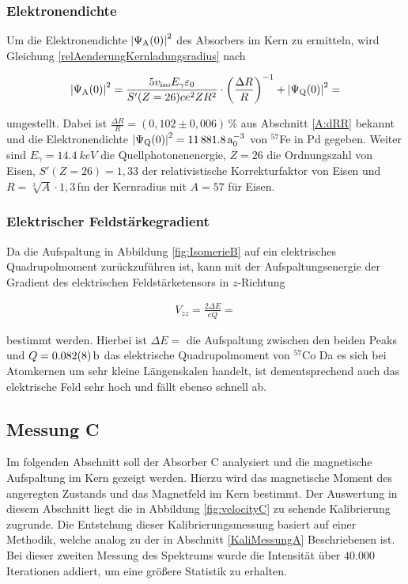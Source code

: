 \documentclass[
a4paper,                %
titlepage=firstiscover, %
captions=tableheading,  %
toc=bibliography,       %
toc=listof,             %
oneside,                %
automark,               %
12pt,                   %
english, ngerman,       %
parskip = half,         %
]{scrartcl}
\begin{document}
\subsubsection{Elektronendichte}

Um die Elektronendichte $\abs{\Psi_\text{A}(0)}^2$ des Absorbers im Kern zu ermitteln, wird Gleichung \ref{relAenderungKernladungsradius} nach

\begin{align}
\abs{\Psi_\text{A}(0)}^2 = \frac{5 v_\text{iso} E_\gamma \varepsilon_0}{S'(Z = 26) c e^2 Z R^2}\cdot\left( \frac{\Delta R}{R}\right) ^{-1} + \abs{\Psi_\text{Q}(0)}^2 = 
\end{align}

\noindent umgestellt.
Dabei ist $\frac{\Delta R}{R}=(0,102\pm 0,006)\,$\% aus Abschnitt \ref{A:dRR} bekannt und die Elektronendichte $\abs{\Psi_\text{Q}(0)}^2 = \SI{11881,8}{a_0^{-3}}$ von $^57$Fe in Pd gegeben.
Weiter sind $E_\gamma = \SI{14,4}{keV}$ die Quellphotonenenergie, $Z=26$ die Ordnungszahl von Eisen, $S'(Z = 26) = 1,33$ der relativistische Korrekturfaktor von Eisen und $R=\sqrt[3]{A}\cdot 1,3\,$fm der Kernradius mit $A=57$ für Eisen.


\subsubsection{Elektrischer Feldstärkegradient}

Da die Aufspaltung in Abbildung \ref{fig:IsomerieB} auf ein elektrisches Quadrupolmoment zurückzuführen ist, kann mit der Aufspaltungsenergie der Gradient des elektrischen Feldstärketensors in $z$-Richtung

\begin{align}
V_{zz} = \frac{2 \Delta E}{e Q} = 
\end{align}

\noindent bestimmt werden.
Hierbei ist $\Delta E = $ die Aufspaltung zwischen den beiden Peaks und $Q = \SI{0,082 \pm 0,008}{b}$ das elektrische Quadrupolmoment von $^{57}$Co
Da es sich bei Atomkernen um sehr kleine Längenskalen handelt, ist dementsprechend auch das elektrische Feld sehr hoch und fällt ebenso schnell ab.


\subsection{Messung C}

Im folgenden Abschnitt soll der Absorber C analysiert und die magnetische Aufspaltung im Kern gezeigt werden.
Hierzu wird das magnetische Moment des angeregten Zustands und das Magnetfeld im Kern bestimmt.
Der Auswertung in diesem Abschnitt liegt die in Abbildung \ref{fig:velocityC} zu sehende Kalibrierung zugrunde.
Die Entstehung dieser Kalibrierungsmessung basiert auf einer Methodik, welche analog zu der in Abschnitt \ref{KaliMessungA} Beschriebenen ist.
Bei dieser zweiten Messung des Spektrums wurde die Intensität über $40.000$ Iterationen addiert, um eine größere Statistik zu erhalten.
\end{document}
